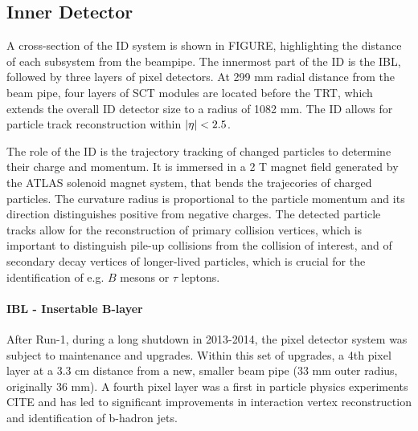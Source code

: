 \subsection{Inner Detector}
\label{subsec:atlas:atlas:id}

A cross-section of the \ac{ID} system \cite{IDTDR} is shown in FIGURE, highlighting the distance of each subsystem from the beampipe. The innermost part of the \ac{ID} is the \ac{IBL}, followed by three layers of pixel detectors. At 299 mm radial distance from the beam pipe, four layers of \ac{SCT} modules are located before the \ac{TRT}, which extends the overall \ac{ID} detector size to a radius of 1082 mm. The \ac{ID} allows for particle track reconstruction within $|\eta| < 2.5$.

The role of the \ac{ID} is the trajectory tracking of changed particles to determine their charge and momentum. It is immersed in a 2 T magnet field generated by the \ac{ATLAS} solenoid magnet system, that bends the trajecories of charged particles. The curvature radius is proportional to the particle momentum and its direction distinguishes positive from negative charges. The detected particle tracks allow for the reconstruction of primary collision vertices, which is important to distinguish pile-up collisions from the collision of interest, and of secondary decay vertices of longer-lived particles, which is crucial for the identification of e.g. \(B\) mesons or \(\tau\) leptons.



\paragraph{IBL - Insertable B-layer}
After Run-1, during a long shutdown in 2013-2014, the pixel detector system was subject to maintenance and upgrades. Within this set of upgrades, a 4th pixel layer at a 3.3 cm distance from a new, smaller beam pipe (33 mm outer radius, originally 36 mm).
A fourth pixel layer was a first in particle physics experiments CITE and has led to significant improvements in interaction vertex reconstruction and identification of b-hadron jets.


